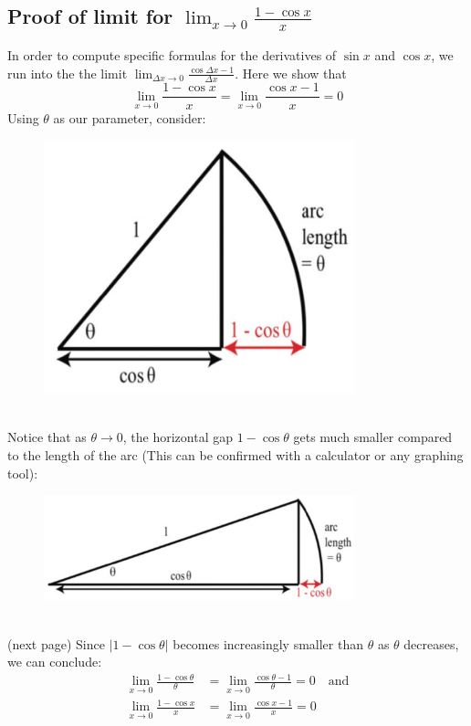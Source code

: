 \documentclass{report}
\begin{document}
\subsection{Proof of limit for $\lim_{x\to 0}\frac{1-\cos x}{x}$}%
In order to compute specific formulas for the derivatives of $\sin x$ and $\cos x$, we run into 
the the limit $\lim_{\Delta x\to 0}\frac{\cos\Delta x-1}{\Delta x}$. Here we show that
\begin{equation*}
\lim_{x\to 0}\frac{1-\cos x}{x}=\lim_{x\to 0}\frac{\cos x-1}{x}=0
\end{equation*}
Using $\theta$ as our parameter, consider:
\begin{figure}[h]
\includegraphics[width=9cm]{Capture9}
\centering
{}
\end{figure}\\ 
Notice that as $\theta\to 0$, the horizontal gap $1-\cos\theta$ gets much smaller compared to
the length of the arc (This can be confirmed with a calculator or any graphing tool):
\begin{figure}[h]
\includegraphics[width=9cm]{Capture10}
\centering
{}
\end{figure}\\ 
(next page)
\newpage    
\noindent Since $|1-\cos\theta|$ becomes increasingly smaller than 
$\theta$ as $\theta$ decreases, we can conclude:
\begin{align*}
\lim_{x\to 0}\frac{1-\cos\theta}{\theta}&=\lim_{x\to 0}\frac{\cos\theta-1}{\theta}
=0\quad\text{and}\\
\lim_{x\to 0}\frac{1-\cos x}{x}&=\lim_{x\to 0}\frac{\cos x-1}{x}=0
\end{align*}
\end{document}
